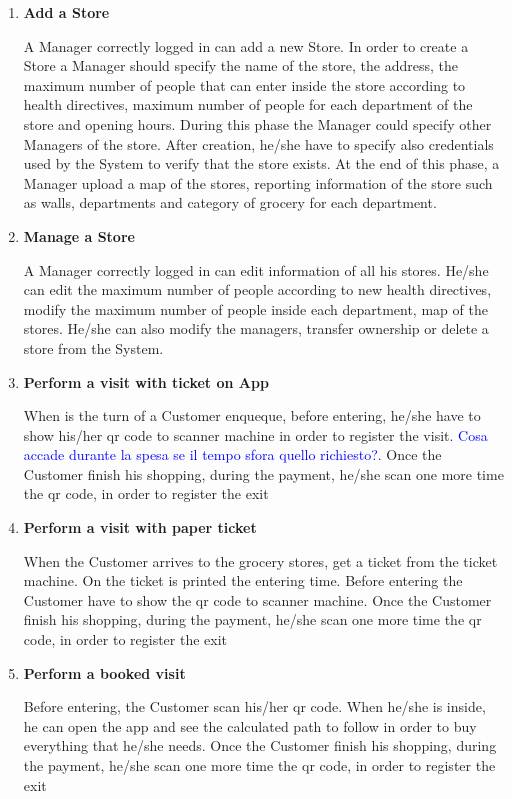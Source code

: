 \documentclass[a4paper, 10pt, oneside]{article}
\newcommand{\giovanni}[1]{\textcolor{Blue}{#1}}
\begin{document}
\begin{enumerate}
    \item \textbf{Add a Store}
    \begin{flushleft}
        A Manager correctly logged in can add a new  Store.
        In order to create a Store a Manager should specify the name of the store, the address, the maximum number of people that can enter inside the store according to health directives, maximum number of people for each department of the store and opening hours. During this phase the Manager could specify other Managers of the store. After creation, he/she have to specify also credentials used by the System to verify that the store exists. At the end of this phase, a Manager upload a map of the stores, reporting information of the store such as walls, departments and category of grocery for each department.
    \end{flushleft}
    \item \textbf{Manage a Store}
    \begin{flushleft}
        A Manager correctly logged in can edit information of all his stores. He/she can edit the maximum number of people according to new health directives, modify the maximum number of people inside each department, map of the stores. He/she can also modify the managers, transfer ownership or delete a store from the System.
    \end{flushleft}
    \item \textbf{Perform a visit with ticket on App}
    \begin{flushleft}
        When is the turn of a Customer enqueque, before entering, he/she have to show his/her qr code to scanner machine in order to register the visit. \giovanni{Cosa accade durante la spesa se il tempo sfora quello richiesto?}.
        Once the Customer finish his shopping, during the payment, he/she scan one more time the qr code, in order to register the exit
    \end{flushleft}
    \item \textbf{Perform a visit with paper ticket}
     \begin{flushleft}
        When the Customer arrives to the grocery stores, get a ticket from the ticket machine. On the ticket is printed the entering time. Before entering the Customer have to show the qr code to scanner machine. Once the Customer finish his shopping, during the payment, he/she scan one more time the qr code, in order to register the exit
    \end{flushleft}
    \item \textbf{Perform a booked visit}
    \begin{flushleft}
        Before entering, the Customer scan his/her qr code. When he/she is inside, he can open the app and see the calculated path to follow in order to buy everything that he/she needs. Once the Customer finish his shopping, during the payment, he/she scan one more time the qr code, in order to register the exit
    \end{flushleft}
\end{enumerate}
\end{document}
